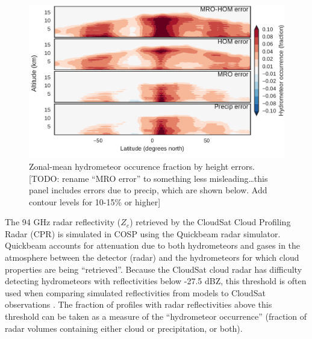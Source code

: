 \begin{figure}[htbp]
\centering
\includegraphics{graphics/subgrid1_hfba_zonal_diff.pdf}
\caption{\label{fig:subgrid1_hfba_zonal_diff}Zonal-mean hydrometeor
occurence fraction by height errors. {[}TODO: rename ``MRO error'' to
something less misleading\ldots{}this panel includes errors due to
precip, which are shown below. Add contour levels for 10-15\% or
higher{]}}\label{fig:subgrid1ux5fhfbaux5fzonalux5fdiff}
\end{figure}

The 94 GHz radar reflectivity (\(Z_e\)) retrieved by the CloudSat Cloud
Profiling Radar (CPR) is simulated in COSP using the Quickbeam
\citep{haynes_et_al_2007} radar simulator. Quickbeam accounts for
attenuation due to both hydrometeors and gases in the atmosphere between
the detector (radar) and the hydrometeors for which cloud properties are
being ``retrieved''. Because the CloudSat cloud radar has difficulty
detecting hydrometeors with reflectivities below -27.5 dBZ, this
threshold is often used when comparing simulated reflectivities from
models to CloudSat observations \citep{marchand_et_al_2009}. The
fraction of profiles with radar reflectivities above this threshold can
be taken as a measure of the ``hydrometeor occurrence'' (fraction of
radar volumes containing either cloud or precipitation, or both).


